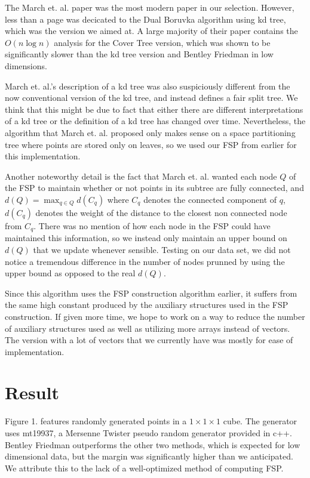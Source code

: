 \documentclass[11pt]{article}
\begin{document}
The March et. al. paper was the most modern paper in our selection. However, less than a page was decicated to the Dual Boruvka algorithm using kd tree, which was the version we aimed at. A large majority of their paper contains the $O(n\log{n})$ analysis for the Cover Tree version, which was shown to be significantly slower than the kd tree version and Bentley Friedman in low dimensions.\cite{Dual}

March et. al.'s description of a kd tree was also suspiciously different from the now conventional version of the kd tree, and instead defines a fair split tree. We think that this might be due to fact that either there are different interpretations of a kd tree or the definition of a kd tree has changed over time. Nevertheless, the algorithm that March et. al. proposed only makes sense on a space partitioning tree where points are stored only on leaves, so we used our FSP from earlier for this implementation. 

Another noteworthy detail is the fact that March et. al. wanted each node $Q$ of the FSP to maintain whether or not points in its subtree are fully connected, and $d(Q) = \max_{q \in Q} d(C_q)$ where $C_q$ denotes the connected component of $q$, $d(C_q)$ denotes the weight of the distance to the closest non connected node from $C_q$. There was no mention of how each node in the FSP could have maintained this information, so we instead only maintain an upper bound on $d(Q)$ that we update whenever sensible. Testing on our data set, we did not notice a tremendous difference in the number of nodes prunned by using the upper bound as opposed to the real $d(Q)$. 

Since this algorithm uses the FSP construction algorithm earlier, it suffers from the same high constant produced by the auxiliary structures used in the FSP construction. If given more time, we hope to work on a way to reduce the number of auxiliary structures used as well as utilizing more arrays instead of vectors. The version with a lot of vectors that we currently have was mostly for ease of implementation. 

\section{Result}

Figure 1. features randomly generated points in a $1 \times 1 \times 1$ cube. The generator uses mt19937, a Mersenne Twister pseudo random generator provided in c++. Bentley Friedman outperforms the other two methods, which is expected for low dimensional data, but the margin was significantly higher than we anticipated. We attribute this to the lack of a well-optimized method of computing FSP.
\end{document}
